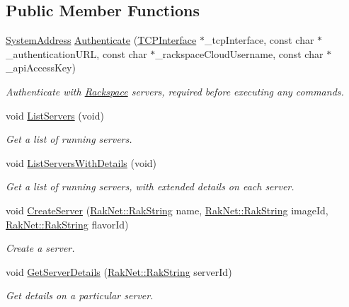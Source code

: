 \subsection*{Public Member Functions}
\begin{DoxyCompactItemize}
\item 
\hyperlink{struct_rak_net_1_1_system_address}{System\-Address} \hyperlink{class_rak_net_1_1_rackspace_ae2cddeea6dfa83a9aa480666723812c8}{Authenticate} (\hyperlink{class_rak_net_1_1_t_c_p_interface}{T\-C\-P\-Interface} $\ast$\-\_\-tcp\-Interface, const char $\ast$\-\_\-authentication\-U\-R\-L, const char $\ast$\-\_\-rackspace\-Cloud\-Username, const char $\ast$\-\_\-api\-Access\-Key)
\begin{DoxyCompactList}\small\item\em Authenticate with \hyperlink{class_rak_net_1_1_rackspace}{Rackspace} servers, required before executing any commands. \end{DoxyCompactList}\item 
void \hyperlink{class_rak_net_1_1_rackspace_a46e4d34b49522f0c352c75d812b59fda}{List\-Servers} (void)
\begin{DoxyCompactList}\small\item\em Get a list of running servers. \end{DoxyCompactList}\item 
void \hyperlink{class_rak_net_1_1_rackspace_a8251a4c5262426ccec93089f669856eb}{List\-Servers\-With\-Details} (void)
\begin{DoxyCompactList}\small\item\em Get a list of running servers, with extended details on each server. \end{DoxyCompactList}\item 
void \hyperlink{class_rak_net_1_1_rackspace_ade33ad85f93d1348b139b7b0da241479}{Create\-Server} (\hyperlink{class_rak_net_1_1_rak_string}{Rak\-Net\-::\-Rak\-String} name, \hyperlink{class_rak_net_1_1_rak_string}{Rak\-Net\-::\-Rak\-String} image\-Id, \hyperlink{class_rak_net_1_1_rak_string}{Rak\-Net\-::\-Rak\-String} flavor\-Id)
\begin{DoxyCompactList}\small\item\em Create a server. \end{DoxyCompactList}\item 
void \hyperlink{class_rak_net_1_1_rackspace_a90511872666452548f7ce7e6b1645394}{Get\-Server\-Details} (\hyperlink{class_rak_net_1_1_rak_string}{Rak\-Net\-::\-Rak\-String} server\-Id)
\begin{DoxyCompactList}\small\item\em Get details on a particular server. \end{DoxyCompactList}\item 

\end{DoxyCompactItemize}
